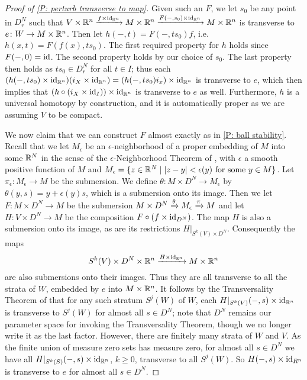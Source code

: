 \begin{proof}[Proof of \cref{P: perturb transverse to map}]
	Given such an $F$, we let $s_0$ be any point in $D_r^N$ such that $V \times \mathbb{R}^n \xrightarrow{f \times \mathrm{id}_{\mathbb{R}^n}} M \times \mathbb{R}^n \xrightarrow{F(-,s_0) \times \mathrm{id}_{\mathbb{R}^n}}M \times \mathbb{R}^n$ is transverse to $e \colon W \to M \times \mathbb{R}^n$.
	Then let $h(-,t) = F(-,ts_0)f$, i.e.\ $h(x,t) = F(f(x),ts_0)$.
	The first required property for $h$ holds since $F(-,0) = \mathrm{id}$.
	The second property holds by our choice of $s_0$.
	The last property then holds as $ts_0 \in D_r^N$ for all $t \in I$; thus each $(h(-,ts_0) \times \mathrm{id}_{\mathbb{R}^n})(i_X \times \mathrm{id}_{\mathbb{R}^n}) = (h(-,ts_0)i_x) \times \mathrm{id}_{\mathbb{R}^n}$ is transverse to $e$, which then implies that $(h \circ (i_{X} \times \mathrm{id}_I)) \times \mathrm{id}_{\mathbb{R}^n}$ is transverse to $e$ as well.
	Furthermore, $h$ is a universal homotopy by construction, and it is automatically proper as we are assuming $V$ to be compact.

	We now claim that we can construct $F$ almost exactly as in \cref{P: ball stability}.
	Recall that we let $M_\epsilon$ be an $\epsilon$-neighborhood of a proper embedding of $M$ into some $\mathbb{R}^N$ in the sense of the $\epsilon$-Neighborhood Theorem of \cite[Section 2.3]{GuPo74}, with $\epsilon$ a smooth positive function of $M$ and $M_\epsilon = \{z \in \mathbb{R}^N \mid |z-y|<\epsilon(y) \text{ for some }y \in M\}$.
	Let $\pi_\epsilon: M_\epsilon \to M$ be the submersion.
	We define $\theta: M \times D^N \to M_\epsilon$ by $\theta(y, s) = y + \epsilon(y) s$, which is a submersion onto its image.
	Then we let $F \colon M \times D^N \to M$ be the submersion $M \times D^N \xrightarrow{\theta}M_\epsilon \xrightarrow{\pi}M$ and let $H \colon V \times D^N \to M$ be the composition $F \circ (f \times \mathrm{id}_{D^N})$.
	The map $H$ is also a submersion onto its image, as are its restrictions $H|_{S^k(V) \times D^N}$.
	Consequently the maps
	$$S^k(V) \times D^N \times \mathbb{R}^n \xrightarrow{H \times \mathrm{id}_{\mathbb{R}^n}} M \times \mathbb{R}^n$$
	are also submersions onto their images.
	Thus they are all transverse to all the strata of $W$, embedded by $e$ into $M \times \mathbb{R}^n$.
	It follows by the Transversality Theorem of \cite[Section 2.3]{GuPo74} that for any such stratum $S^j(W)$ of $W$, each $H|_{S^k(V)}(-,s) \times \mathrm{id}_{\mathbb{R}^n}$ is transverse to $S^j(W)$ for almost all $s \in D^N$; note that $D^N$ remains our parameter space for invoking the Transversality Theorem, though we no longer write it as the last factor.
	However, there are finitely many strata of $W$ and $V$.
	As the finite union of measure zero sets has measure zero, for almost all $s \in D^N$ we have all $H|_{S^k(S)}(-,s) \times \mathrm{id}_{\mathbb{R}^n}$, $k\geq 0$, transverse to all $S^j(W)$.
	So $H(-,s) \times \mathrm{id}_{R^n}$ is transverse to $e$ for almost all $s \in D^N$.


\end{proof}
